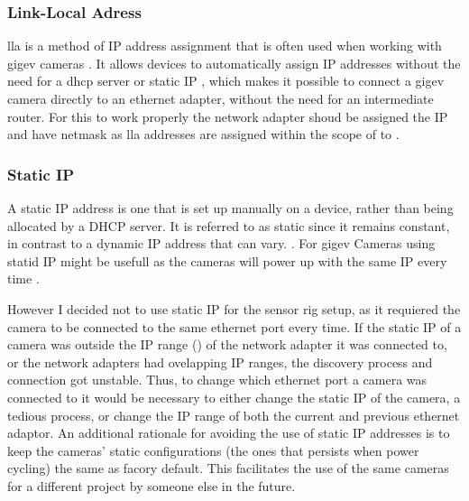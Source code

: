 \subsubsection{Link-Local Adress}
\gls{lla} is a method of IP address assignment that is often used when working with \gls{gigev} cameras \cite{teledyneSettingIPAddress01} \cite{lucidvisionlabsArenaSoftwareDevelopment2020}.
It allows devices to automatically assign IP addresses without the need for a \gls{dhcp} server or static IP \cite{annieahujaweb2020LinkLocalAddress2022}, which makes it possible to connect a \gls{gigev} camera directly to an ethernet adapter, without the need for an intermediate router.
For this to work properly the network adapter shoud be assigned the IP  and have netmask  as \gls{lla} addresses are assigned within the scope of  to  \cite{annieahujaweb2020LinkLocalAddress2022}\cite{lucidvisionlabsArenaSoftwareDevelopment2020}.

\subsubsection{Static IP}
A static IP address is one that is set up manually on a device, rather than being allocated by a DHCP server. It is referred to as static since it remains constant, in contrast to a dynamic IP address that can vary. \cite{fisherStaticIPAddresses2021}.
For \gls{gigev} Cameras using statid IP might be usefull as the cameras will power up with the same IP every time \cite{teledyneSettingPersistentIP}.

However I decided not to use static IP for the sensor rig setup, as it requiered the camera to be connected to the same ethernet port every time.
If the static IP of a camera was outside the IP range (\todo) of the network adapter it was connected to, or the network adapters had ovelapping IP ranges, the discovery process and connection got unstable.
Thus, to change which ethernet port a camera was connected to it would be necessary to either change the static IP of the camera, a tedious process, or change the IP range of both the current and previous ethernet adaptor.
An additional rationale for avoiding the use of static IP addresses is to keep the cameras' static configurations (the ones that persists when power cycling) the same as facory default.
This facilitates the use of the same cameras for a different project by someone else in the future.

